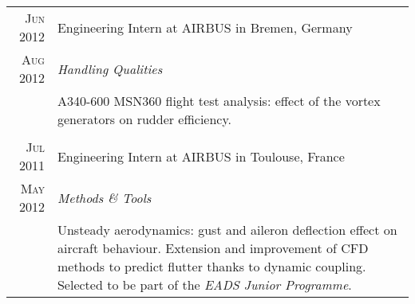 \documentclass[a4paper,10pt]{article}
\begin{document}
\begin{tabular}{r|p{15cm}}
    \textsc{Jun 2012} & Engineering Intern at \textsc{AIRBUS} in Bremen, Germany                                                                                   \\
    \textsc{Aug 2012} & \emph{Handling Qualities}                                                                                                                  \\
                      & \footnotesize{A340-600 MSN360 flight test analysis: effect of the vortex generators on rudder efficiency.}                                 \\
    \multicolumn{2}{c}{}                                                                                                                                           \\

    \textsc{Jul 2011} & Engineering Intern at \textsc{AIRBUS} in Toulouse, France                                                                                  \\
    \textsc{May 2012} & \emph{Methods \& Tools}                                                                                                                    \\
                      & \footnotesize{Unsteady aerodynamics: gust and aileron deflection effect on aircraft behaviour.
        Extension and improvement of CFD methods to predict flutter thanks to dynamic coupling.
        Selected to be part of the \emph{EADS Junior Programme}.}
\end{tabular}
\end{document}
